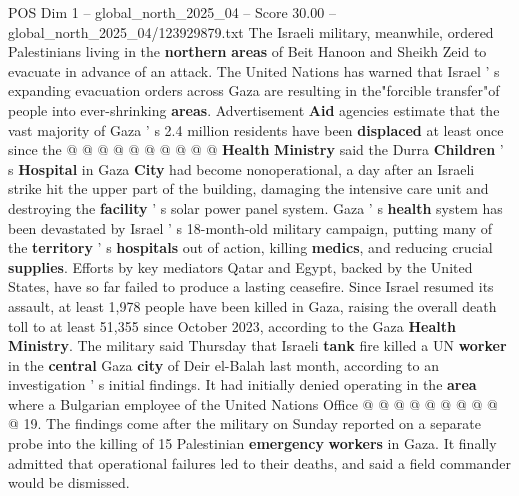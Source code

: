 \begin{textsample}{POS Dim 1 – global\_north\_2025\_04 – Score 30.00 – global\_north\_2025\_04/123929879.txt}
The Israeli military, meanwhile, ordered Palestinians living in the \textbf{northern} \textbf{areas} of Beit Hanoon and Sheikh Zeid to evacuate in advance of an attack.
The United Nations has warned that Israel ' s expanding evacuation orders across Gaza are resulting in the"forcible transfer"of people into ever-shrinking \textbf{areas}.
Advertisement \textbf{Aid} agencies estimate that the vast majority of Gaza ' s 2.4 million residents have been \textbf{displaced} at least once since the @ @ @ @ @ @ @ @ @ @ \textbf{Health} \textbf{Ministry} said the Durra \textbf{Children} ' s \textbf{Hospital} in Gaza \textbf{City} had become nonoperational, a day after an Israeli strike hit the upper part of the building, damaging the intensive care unit and destroying the \textbf{facility} ' s solar power panel system.
Gaza ' s \textbf{health} system has been devastated by Israel ' s 18-month-old military campaign, putting many of the \textbf{territory} ' s \textbf{hospitals} out of action, killing \textbf{medics}, and reducing crucial \textbf{supplies}.
Efforts by key mediators Qatar and Egypt, backed by the United States, have so far failed to produce a lasting ceasefire.
Since Israel resumed its assault, at least 1,978 people have been killed in Gaza, raising the overall death toll to at least 51,355 since October 2023, according to the Gaza \textbf{Health} \textbf{Ministry}.
The military said Thursday that Israeli \textbf{tank} fire killed a UN \textbf{worker} in the \textbf{central} Gaza \textbf{city} of Deir el-Balah last month, according to an investigation ' s initial findings.
It had initially denied operating in the \textbf{area} where a Bulgarian employee of the United Nations Office @ @ @ @ @ @ @ @ @ @ 19.
The findings come after the military on Sunday reported on a separate probe into the killing of 15 Palestinian \textbf{emergency} \textbf{workers} in Gaza.
It finally admitted that operational failures led to their deaths, and said a field commander would be dismissed.

\end{textsample}
